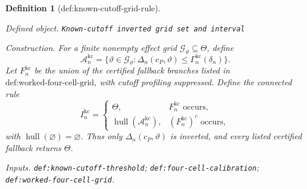 \documentclass{article}
\newtheorem{definition}{Definition}
\begin{document}
\begin{definition}[def:known-cutoff-grid-rule]\label{def:known-cutoff-grid-rule}
\par\smallskip\noindent\emph{Defined object.} \texttt{Known-\allowbreak{}cutoff inverted grid set and interval}
\par\smallskip\noindent\emph{Construction.} For a finite nonempty effect grid \(\mathcal G_\vartheta\subseteq\Theta\), define \[\mathcal A_n^{\mathrm{kc}}=\{\vartheta\in\mathcal G_\vartheta:\Delta_n(c_P,\vartheta)\le\Gamma_n^{\mathrm{kc}}(\delta_n)\}.\] Let \(F_n^{\mathrm{kc}}\) be the union of the certified fallback branches listed in \(\text{def:worked-four-cell-grid}\), with cutoff profiling suppressed. Define the connected rule \[I_n^{\mathrm{kc}}=\begin{cases}\Theta,&F_n^{\mathrm{kc}}\text{ occurs},\\ \operatorname{hull}(\mathcal A_n^{\mathrm{kc}}),&(F_n^{\mathrm{kc}})^c\text{ occurs},\end{cases}\] with \(\operatorname{hull}(\varnothing)=\varnothing\). Thus only \(\Delta_n(c_P,\vartheta)\) is inverted, and every listed certified fallback returns \(\Theta\).
\par\smallskip\noindent\emph{Inputs.} \texttt{def:\allowbreak{}known-\allowbreak{}cutoff-\allowbreak{}threshold}; \texttt{def:\allowbreak{}four-\allowbreak{}cell-\allowbreak{}calibration}; \texttt{def:\allowbreak{}worked-\allowbreak{}four-\allowbreak{}cell-\allowbreak{}grid}.
\end{definition}
\end{document}
